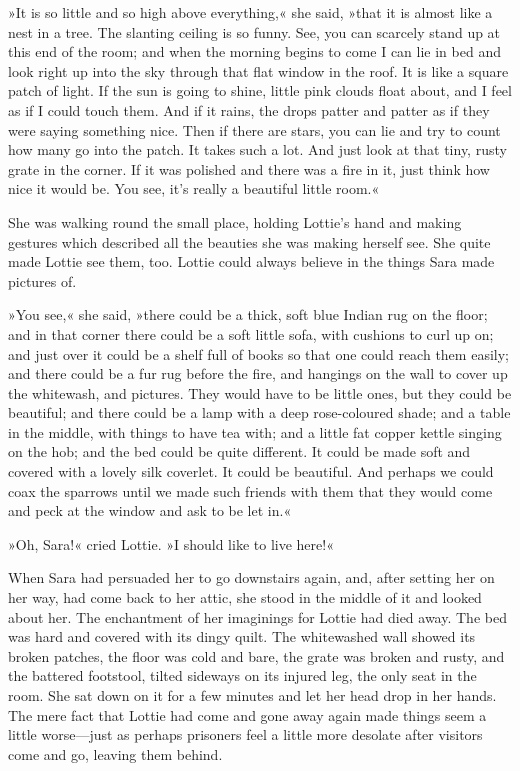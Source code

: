 »It is so little and so high above everything,« she said, »that it is almost like a nest in a tree. The slanting ceiling is so funny. See, you can scarcely stand up at this end of the room; and when the morning begins to come I can lie in bed and look right up into the sky through that flat window in the roof. It is like a square patch of light. If the sun is going to shine, little pink clouds float about, and I feel as if I could touch them. And if it rains, the drops patter and patter as if they were saying something nice. Then if there are stars, you can lie and try to count how many go into the patch. It takes such a lot. And just look at that tiny, rusty grate in the corner. If it was polished and there was a fire in it, just think how nice it would be. You see, it's really a beautiful little room.«

She was walking round the small place, holding Lottie's hand and making gestures which described all the beauties she was making herself see. She quite made Lottie see them, too. Lottie could always believe in the things Sara made pictures of.

»You see,« she said, »there could be a thick, soft blue Indian rug on the floor; and in that corner there could be a soft little sofa, with cushions to curl up on; and just over it could be a shelf full of books so that one could reach them easily; and there could be a fur rug before the fire, and hangings on the wall to cover up the whitewash, and pictures. They would have to be little ones, but they could be beautiful; and there could be a lamp with a deep rose-coloured shade; and a table in the middle, with things to have tea with; and a little fat copper kettle singing on the hob; and the bed could be quite different. It could be made soft and covered with a lovely silk coverlet. It could be beautiful. And perhaps we could coax the sparrows until we made such friends with them that they would come and peck at the window and ask to be let in.«

»Oh, Sara!« cried Lottie. »I should like to live here!«

When Sara had persuaded her to go downstairs again, and, after setting her on her way, had come back to her attic, she stood in the middle of it and looked about her. The enchantment of her imaginings for Lottie had died away. The bed was hard and covered with its dingy quilt. The whitewashed wall showed its broken patches, the floor was cold and bare, the grate was broken and rusty, and the battered footstool, tilted sideways on its injured leg, the only seat in the room. She sat down on it for a few minutes and let her head drop in her hands. The mere fact that Lottie had come and gone away again made things seem a little worse—just as perhaps prisoners feel a little more desolate after visitors come and go, leaving them behind.

